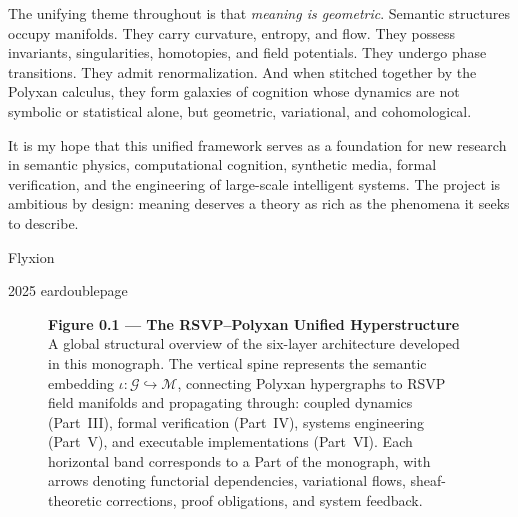 The unifying theme throughout is that \emph{meaning is geometric}.  
Semantic structures occupy manifolds. They carry curvature, entropy, and
flow. They possess invariants, singularities, homotopies, and field
potentials. They undergo phase transitions. They admit renormalization.
And when stitched together by the Polyxan calculus, they form galaxies
of cognition whose dynamics are not symbolic or statistical alone, but
geometric, variational, and cohomological.

It is my hope that this unified framework serves as a foundation for new
research in semantic physics, computational cognition, synthetic media,
formal verification, and the engineering of large-scale intelligent
systems. The project is ambitious by design: meaning deserves a theory as
rich as the phenomena it seeks to describe.

\medskip

\hfill Flyxion

\hfill 2025
eardoublepage
\begin{figure}[p] %
  \centering
  

  \caption*{\textbf{Figure 0.1 — The RSVP–Polyxan Unified Hyperstructure}\\[0.5em]
  \small
  A global structural overview of the six-layer architecture developed in this monograph. 
  The vertical spine represents the semantic embedding 
  $\iota : \mathcal{G} \hookrightarrow \mathcal{M}$, 
  connecting Polyxan hypergraphs to RSVP field manifolds and propagating 
  through: coupled dynamics (Part~III), 
  formal verification (Part~IV), 
  systems engineering (Part~V), 
  and executable implementations (Part~VI). 
  Each horizontal band corresponds to a Part of the monograph, 
  with arrows denoting functorial dependencies, variational flows, 
  sheaf-theoretic corrections, proof obligations, and system feedback.
  }

\end{figure}
\cleardoublepage


